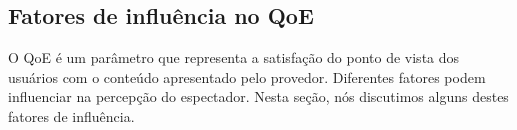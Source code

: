 %
%
%
%

\subsection{Fatores de influência no QoE}

O QoE é um parâmetro que representa a satisfação do ponto de vista dos usuários com o conteúdo apresentado pelo provedor. Diferentes fatores podem influenciar na percepção do espectador. Nesta seção, nós discutimos alguns destes fatores de influência. 

